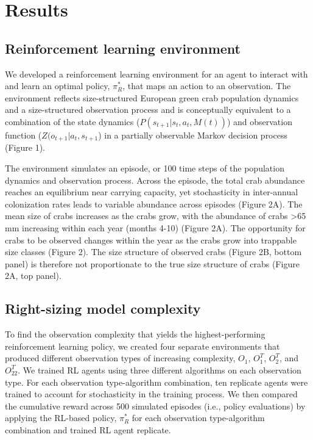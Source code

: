 \documentclass{article}
\begin{document}
\section{Results}

\subsection{Reinforcement learning environment}

We developed a reinforcement learning environment for an agent to interact with and learn an optimal policy, $\pi^*_R$, that maps an action to an observation. The environment reflects size-structured European green crab population dynamics and a size-structured observation process and is conceptually equivalent to a combination of the state dynamics ($P(s_{t+1}|s_t, a_t, M(t))$) and observation function ($Z(o_{t+1}|a_t, s_{t+1}$) in a partially observable Markov decision process (Figure 1).

The environment simulates an episode, or 100 time steps of the population dynamics and observation process. Across the episode, the total crab abundance reaches an equilibrium near carrying capacity, yet stochasticity in inter-annual colonization rates leads to variable abundance across episodes (Figure 2A). The mean size of crabs increases as the crabs grow, with the abundance of crabs >65 mm increasing within each year (months 4-10) (Figure 2A). The opportunity for crabs to be observed changes within the year as the crabs grow into trappable size classes (Figure 2). The size structure of observed crabs (Figure 2B, bottom panel) is therefore not proportionate to the true size structure of crabs (Figure 2A, top panel).

\subsection{Right-sizing model complexity}

To find the observation complexity that yields the highest-performing reinforcement learning policy, we created four separate environments that produced different observation types of increasing complexity, $O_1$, $O_1^T$, $O_2^T$, and $O_{22}^T$. We trained RL agents using three different algorithms on each observation type. For each observation type-algorithm combination, ten replicate agents were trained to account for stochasticity in the training process. We then compared the cumulative reward across 500 simulated episodes (i.e., policy evaluations) by applying the RL-based policy, $\pi^*_R$ for each observation type-algorithm combination and trained RL agent replicate. 
\end{document}

